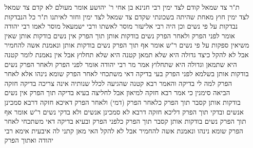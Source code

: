 \documentclass[12pt, openany]{book}
\begin{document}
{ת"ר צד שמאל קודם לצד ימין רבי חנינא בן אחי ר' יהושע אומר מעולם לא קדם צד שמאל לצד ימין חוץ מאחת שהיתה בשכונתי שקדם צד שמאל לצד ימין וחזר לאיתנו 
ת"ר כל הנבדקות נבדקות על פי נשים וכן היה רבי אליעזר מוסר לאשתו ורבי ישמעאל מוסר לאמו 
רבי יהודה אומר לפני הפרק ולאחר הפרק נשים בודקות אותן תוך הפרק אין נשים בודקות אותן שאין משיאין ספקות על פי נשים ר"ש אומר אף תוך הפרק נשים בודקות אותן ונאמנת אשה להחמיר אבל לא להקל 
כיצד גדולה היא שלא תמאן קטנה היא שלא תחלוץ 
אבל אין נאמנת לומר קטנה היא שתמאן וגדולה היא שתחלוץ 
אמר מר רבי יהודה אומר לפני הפרק ולאחר הפרק נשים בודקות אותן בשלמא לפני הפרק בעי בדיקה דאי משתכחי לאחר הפרק שומא נינהו 
אלא לאחר הפרק למה לי בדיקה והאמר רבא קטנה שהגיעה לכלל שנותיה אינה צריכה בדיקה חזקה הביאה סימנין כי אמר רבא חזקה למיאון אבל לחליצה בעיא בדיקה 
תוך הפרק אין נשים בודקות אותן קסבר תוך הפרק כלאחר הפרק (דמי)
ולאחר הפרק דאיכא חזקה דרבא סמכינן אנשים ובדקי תוך הפרק דליכא חזקה דרבא לא סמכינן אנשים ולא בדקי נשים 
ר"ש אומר אף תוך הפרק נשים בודקות אותן קסבר תוך הפרק כלפני הפרק ובעיא בדיקה דאי משתכחי לאחר הפרק שומא נינהו 
ונאמנת אשה להחמיר אבל לא להקל האי מאן קתני לה איבעית אימא רבי יהודה ואתוך הפרק}
\end{document}
